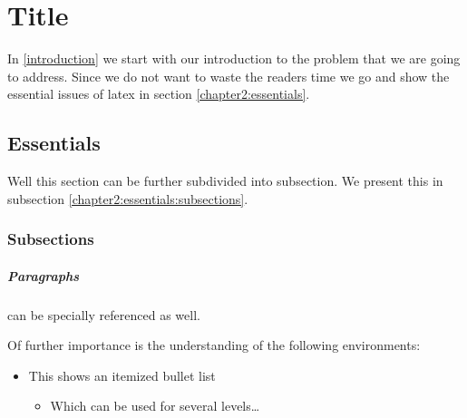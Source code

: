 
\chapter{\label{chapter2}Title}
In \ref{introduction} we start with our introduction to the problem that we 
are going to address.  Since we do not want to waste the readers time we 
go and show the essential issues of latex in section
\ref{chapter2:essentials}.

\section{\label{chapter2:essentials}Essentials}

Well this section can be further subdivided into subsection.  We present 
this in subsection \ref{chapter2:essentials:subsections}.

\subsection{\label{chapter2:essentials:subsections}Subsections}

\paragraph{\label{introduction:essentials:subsections:paragraph}Paragraphs}
can be specially referenced as well.

Of further importance is the understanding of the following environments:

\begin{itemize}
\item This shows an itemized bullet list
  \begin{itemize}
  \item Which can be used for several levels\ldots
  \end{itemize}
\end{itemize}

